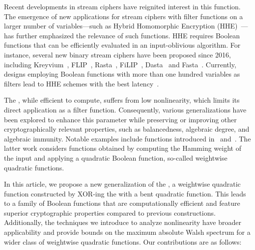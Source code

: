 \documentclass{llncs}
\begin{document}
Recent developments in stream ciphers have reignited interest in this function. The emergence of new applications for stream ciphers with filter functions on a larger number of variables—such as Hybrid Homomorphic Encryption (\textsf{HHE})~\cite{CCS:NaeLauVai11}—has further emphasized the relevance of such functions. \textsf{HHE} requires Boolean functions that can be efficiently evaluated in an input-oblivious algorithm. For instance, several new binary stream ciphers have been proposed since 2016, including Kreyvium~\cite{JOC:CCFLNP18}, \textsf{FLIP}~\cite{EC:MJSC16}, Rasta~\cite{C:Rasta}, \textsf{FiLIP}~\cite{INDO:MCJS19}, Dasta~\cite{TOSC:BeiLea20} and Fasta~\cite{CTRSA:CidIndRad22}. 
Currently, designs employing Boolean functions with more than one hundred variables as filters lead to \textsf{HHE} schemes with the best latency~\cite{INDO:HofMeaRic20,CCS:CDPP22,CIC:MeaParPei24,eprint:AGHM24}.

The \hwbf{}, while efficient to compute, suffers from low nonlinearity, which limits its direct application as a filter function. Consequently, various generalizations have been explored to enhance this parameter while preserving or improving other cryptographically relevant properties, such as balancedness, algebraic degree, and algebraic immunity. Notable examples include functions introduced in~\cite{IEEE:Carlet22,eprint:CarPar23} and~\cite{DAM:MeaOza24}. The latter work considers functions obtained by computing the Hamming weight of the input and applying a quadratic Boolean function, so-called weightwise quadratic functions.

\bigskip

In this article, we propose a new generalization of the \hwbf{}, a weightwise quadratic function constructed by \textsf{XOR}-ing the \hwbf{} with a bent quadratic function. This leads to a family of Boolean functions that are computationally efficient and feature superior cryptographic properties compared to previous constructions. 
Additionally, the techniques we introduce to analyze nonlinearity have broader applicability and provide bounds on the maximum absolute Walsh spectrum for a wider class of weightwise quadratic functions. Our contributions are as follows:
\end{document}
